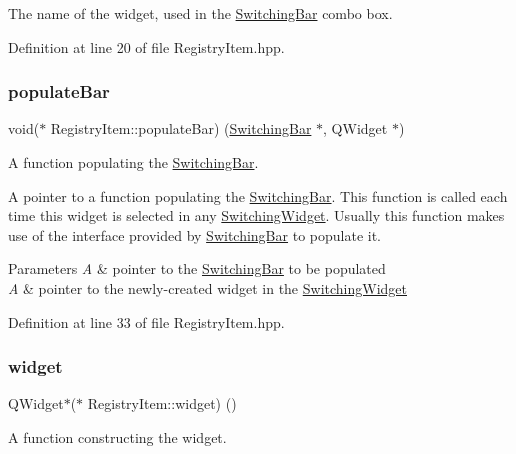 The name of the widget, used in the \hyperlink{class_switching_bar}{Switching\+Bar} combo box. 

Definition at line 20 of file Registry\+Item.\+hpp.

\hypertarget{class_registry_item_a0784869b48c86a581e12c88fd2706cd0}{}\label{class_registry_item_a0784869b48c86a581e12c88fd2706cd0} 
\subsubsection{\texorpdfstring{populate\+Bar}{populateBar}}
{\footnotesize\ttfamily void($\ast$ Registry\+Item\+::populate\+Bar) (\hyperlink{class_switching_bar}{Switching\+Bar} $\ast$, Q\+Widget $\ast$)}



A function populating the \hyperlink{class_switching_bar}{Switching\+Bar}. 

A pointer to a function populating the \hyperlink{class_switching_bar}{Switching\+Bar}. This function is called each time this widget is selected in any \hyperlink{class_switching_widget}{Switching\+Widget}. Usually this function makes use of the interface provided by \hyperlink{class_switching_bar}{Switching\+Bar} to populate it. 
\begin{DoxyParams}{Parameters}
{\em A} & pointer to the \hyperlink{class_switching_bar}{Switching\+Bar} to be populated \\
\hline
{\em A} & pointer to the newly-\/created widget in the \hyperlink{class_switching_widget}{Switching\+Widget} \\
\hline
\end{DoxyParams}


Definition at line 33 of file Registry\+Item.\+hpp.

\hypertarget{class_registry_item_aa95c5a5dbfdf491e53b07dbc0a027e14}{}\label{class_registry_item_aa95c5a5dbfdf491e53b07dbc0a027e14} 
\subsubsection{\texorpdfstring{widget}{widget}}
{\footnotesize\ttfamily Q\+Widget$\ast$($\ast$ Registry\+Item\+::widget) ()}



A function constructing the widget. 

